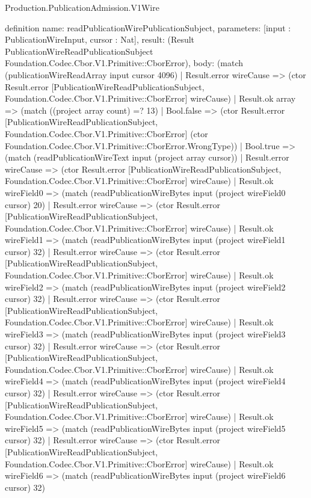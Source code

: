 \begin{lexlean}{Production.PublicationAdmission.V1Wire}
\begin{semanticmodule}
definition{
  name: readPublicationWirePublicationSubject,
  parameters: [input : PublicationWireInput, cursor : Nat],
  result: (Result PublicationWireReadPublicationSubject Foundation.Codec.Cbor.V1.Primitive::CborError),
  body: (match (publicationWireReadArray input cursor 4096)
    | Result.error wireCause => (ctor Result.error [PublicationWireReadPublicationSubject, Foundation.Codec.Cbor.V1.Primitive::CborError] wireCause)
    | Result.ok array => (match ((project array count) =? 13)
      | Bool.false => (ctor Result.error [PublicationWireReadPublicationSubject, Foundation.Codec.Cbor.V1.Primitive::CborError] (ctor Foundation.Codec.Cbor.V1.Primitive::CborError.WrongType))
      | Bool.true => (match (readPublicationWireText input (project array cursor))
        | Result.error wireCause => (ctor Result.error [PublicationWireReadPublicationSubject, Foundation.Codec.Cbor.V1.Primitive::CborError] wireCause)
        | Result.ok wireField0 => (match (readPublicationWireBytes input (project wireField0 cursor) 20)
          | Result.error wireCause => (ctor Result.error [PublicationWireReadPublicationSubject, Foundation.Codec.Cbor.V1.Primitive::CborError] wireCause)
          | Result.ok wireField1 => (match (readPublicationWireBytes input (project wireField1 cursor) 32)
            | Result.error wireCause => (ctor Result.error [PublicationWireReadPublicationSubject, Foundation.Codec.Cbor.V1.Primitive::CborError] wireCause)
            | Result.ok wireField2 => (match (readPublicationWireBytes input (project wireField2 cursor) 32)
              | Result.error wireCause => (ctor Result.error [PublicationWireReadPublicationSubject, Foundation.Codec.Cbor.V1.Primitive::CborError] wireCause)
              | Result.ok wireField3 => (match (readPublicationWireBytes input (project wireField3 cursor) 32)
                | Result.error wireCause => (ctor Result.error [PublicationWireReadPublicationSubject, Foundation.Codec.Cbor.V1.Primitive::CborError] wireCause)
                | Result.ok wireField4 => (match (readPublicationWireBytes input (project wireField4 cursor) 32)
                  | Result.error wireCause => (ctor Result.error [PublicationWireReadPublicationSubject, Foundation.Codec.Cbor.V1.Primitive::CborError] wireCause)
                  | Result.ok wireField5 => (match (readPublicationWireBytes input (project wireField5 cursor) 32)
                    | Result.error wireCause => (ctor Result.error [PublicationWireReadPublicationSubject, Foundation.Codec.Cbor.V1.Primitive::CborError] wireCause)
                    | Result.ok wireField6 => (match (readPublicationWireBytes input (project wireField6 cursor) 32)
}
\end{semanticmodule}
\end{lexlean}
